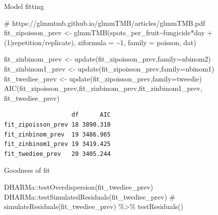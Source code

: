 \documentclass[
  letterpaper,
  DIV=11,
  numbers=noendperiod]{scrreport}
\newenvironment{Shaded}{\begin{snugshade}}{\end{snugshade}}
\newcommand{\AttributeTok}[1]{\textcolor[rgb]{0.40,0.45,0.13}{#1}}
\newcommand{\CommentTok}[1]{\textcolor[rgb]{0.37,0.37,0.37}{#1}}
\newcommand{\DecValTok}[1]{\textcolor[rgb]{0.68,0.00,0.00}{#1}}
\newcommand{\FunctionTok}[1]{\textcolor[rgb]{0.28,0.35,0.67}{#1}}
\newcommand{\NormalTok}[1]{\textcolor[rgb]{0.00,0.23,0.31}{#1}}
\newcommand{\OtherTok}[1]{\textcolor[rgb]{0.00,0.23,0.31}{#1}}
\newcommand{\SpecialCharTok}[1]{\textcolor[rgb]{0.37,0.37,0.37}{#1}}
\begin{document}
Model fitting

\begin{Shaded}
\begin{Highlighting}[]
\CommentTok{\# https://glmmtmb.github.io/glmmTMB/articles/glmmTMB.pdf}
\NormalTok{fit\_zipoisson\_prev }\OtherTok{\textless{}{-}} \FunctionTok{glmmTMB}\NormalTok{(spots\_per\_fruit}\SpecialCharTok{\textasciitilde{}}\NormalTok{fungicide}\SpecialCharTok{*}\NormalTok{day }\SpecialCharTok{+}
\NormalTok{                           (}\DecValTok{1}\SpecialCharTok{|}\NormalTok{repetition}\SpecialCharTok{/}\NormalTok{replicate),}
               \AttributeTok{ziformula =} \SpecialCharTok{\textasciitilde{}}\DecValTok{1}\NormalTok{, }\AttributeTok{family =}\NormalTok{ poisson,}
\NormalTok{             dat)}
\end{Highlighting}
\end{Shaded}

\begin{Shaded}
\begin{Highlighting}[]
\NormalTok{fit\_zinbinom\_prev }\OtherTok{\textless{}{-}} \FunctionTok{update}\NormalTok{(fit\_zipoisson\_prev,}\AttributeTok{family=}\NormalTok{nbinom2)}
\NormalTok{fit\_zinbinom1\_prev }\OtherTok{\textless{}{-}} \FunctionTok{update}\NormalTok{(fit\_zipoisson\_prev,}\AttributeTok{family=}\NormalTok{nbinom1)}
\NormalTok{fit\_twediee\_prev }\OtherTok{\textless{}{-}} \FunctionTok{update}\NormalTok{(fit\_zipoisson\_prev,}\AttributeTok{family=}\NormalTok{tweedie)}
\FunctionTok{AIC}\NormalTok{(fit\_zipoisson\_prev,fit\_zinbinom\_prev,fit\_zinbinom1\_prev, fit\_twediee\_prev)}
\end{Highlighting}
\end{Shaded}

\begin{verbatim}
                   df      AIC
fit_zipoisson_prev 18 3890.310
fit_zinbinom_prev  19 3486.965
fit_zinbinom1_prev 19 3419.425
fit_twediee_prev   20 3405.244
\end{verbatim}

Goodness of fit

\begin{Shaded}
\begin{Highlighting}[]
\NormalTok{DHARMa}\SpecialCharTok{::}\FunctionTok{testOverdispersion}\NormalTok{(fit\_twediee\_prev)}
\NormalTok{DHARMa}\SpecialCharTok{::}\FunctionTok{testSimulatedResiduals}\NormalTok{(fit\_twediee\_prev)}
\CommentTok{\# simulateResiduals(fit\_twediee\_prev) \%\textgreater{}\% testResiduals()}
\end{Highlighting}
\end{Shaded}
\end{document}
